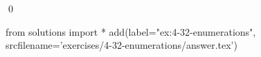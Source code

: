 
\begin{ex}
  \label{ex:4-32-enumerations}
  
  \qed
\end{ex}
\begin{python0}
from solutions import *
add(label="ex:4-32-enumerations",
    srcfilename='exercises/4-32-enumerations/answer.tex')
\end{python0}
